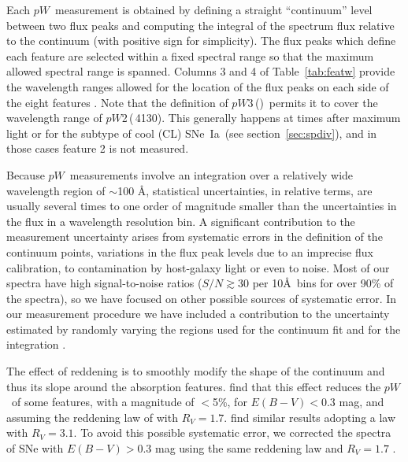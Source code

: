 \documentclass[apj]{emulateapj-rtx4}
\newcommand{\ew}{$pW$}
\newcommand{\pwtwo}{$pW$2\,(\ion{Si}{2}\,4130)}
\newcommand{\pwthree}{$pW$3\,(\ion{Mg}{2})}
\newcommand{\sneia}{SNe~Ia}
\begin{document}
Each \ew\ measurement is obtained by defining a straight
``continuum'' level between two flux peaks and computing the integral
of the spectrum flux relative to the continuum (with positive sign for
simplicity). The flux peaks which define each feature are
selected within a fixed spectral range so that the maximum allowed
spectral range is spanned. Columns 3 and 4 of Table~\ref{tab:featw} provide the
wavelength ranges allowed for the location of the flux peaks on each
side of the eight features \citep[see][]{garavini07}. Note that the
definition of \pwthree\ permits it to cover the wavelength
range of \pwtwo. This generally happens at times after maximum
light or for the subtype of cool (CL) \sneia\ (see
section~\ref{sec:spdiv}), and in those cases feature 2 is not measured.

Because \ew\ measurements involve an integration over a relatively
wide wavelength region of $\sim$100 \AA,
statistical uncertainties, in relative terms, are usually several
times to one order of magnitude smaller than the uncertainties in the
flux in a wavelength resolution bin. A significant contribution to the
measurement uncertainty arises from systematic errors in the
definition of the continuum points, variations in the flux peak levels
due to an imprecise flux calibration, to contamination by host-galaxy
light or even to noise. Most of our spectra have high signal-to-noise
ratios ($S/N \gtrsim 30$ per 10\AA\ bins for over 90\% of the
spectra), so we have focused on other possible sources of systematic
error. In our measurement
procedure we have included a contribution to the uncertainty estimated
by randomly varying the regions used for the continuum fit and for 
the integration \citep[see][]{garavini07}.

The effect of reddening is to smoothly modify the shape of the 
continuum and thus its slope around the absorption
features. \citet{nordin11a}
find that this effect reduces the \ew\ of some features,
with a magnitude of $<$5\%, for $E(B-V)<0.3$ mag, and assuming the
reddening law of \citet{cardelli89} with $R_V=1.7$. \citet{garavini07}
find similar results adopting a law with $R_V=3.1$. To avoid this
possible systematic error, we corrected the spectra of SNe with
$E(B-V)>0.3$ mag using the same reddening law and $R_V=1.7$ \citep[this
choice of $R_V$ is supported by the results of Section~\ref{sec:Lum} and
those of, e.g.,][]{folatelli10,foley11a,mandel11}.  
\end{document}
